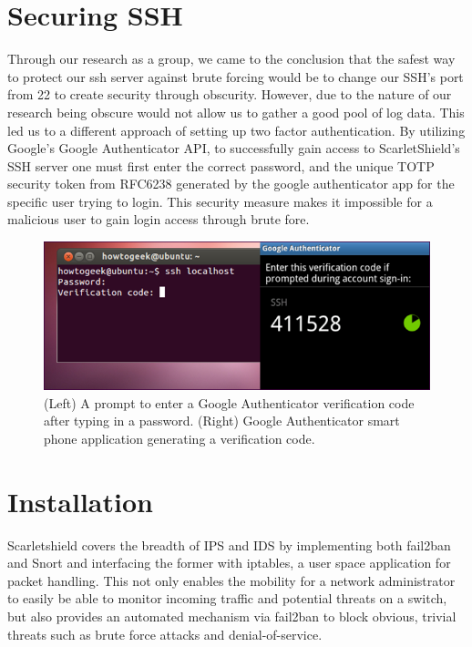 \documentclass[11.5pt,letterpaper,titlepage]{report}
\begin{document}
\section{Securing SSH}

Through our research as a group, we came to the conclusion that the safest way
to protect our ssh server against brute forcing would be to change our SSH’s
port from 22 to create security through obscurity.  However, due to the nature
of our research being obscure would not allow us to gather a good pool of log
data.  This led us to a different approach of setting up two factor
authentication.  By utilizing Google’s Google Authenticator API, to successfully
gain access to ScarletShield’s SSH server one must first enter the correct
password, and the unique TOTP security token from RFC6238 generated by the
google authenticator app for the specific user trying to login.  This security
measure makes it impossible for a malicious user to gain login access through
brute fore.

\begin{figure}[h!]
\centering
  \includegraphics{./goodleauth.png}
  \caption{(Left) A prompt to enter a Google Authenticator verification
  code after typing in a password. (Right) Google Authenticator smart phone application
  generating a verification code.}
\end{figure}

\section{Installation}

Scarletshield covers the breadth of IPS and IDS by implementing both fail2ban
and Snort and interfacing the former with iptables, a user space application for
packet handling.  This not only enables the mobility for a network administrator
to easily be able to monitor incoming traffic and potential threats on a switch,
but also provides an automated mechanism via fail2ban to block obvious, trivial
threats such as brute force attacks and denial-of-service.
\end{document}
